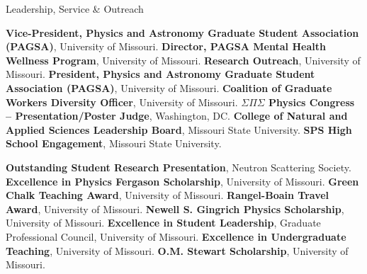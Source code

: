 \begin{rubric}{Leadership, Service \& Outreach}

\entry*[2023--2024] \textbf{Vice-President, Physics and Astronomy Graduate Student Association (PAGSA)}, University of Missouri.
\entry*[2022--2024] \textbf{Director, PAGSA Mental Health Wellness Program}, University of Missouri.
\entry*[2022--2024] \textbf{Research Outreach}, University of Missouri.
\entry*[2022--2023] \textbf{President, Physics and Astronomy Graduate Student Association (PAGSA)}, University of Missouri.
\entry*[2022--2023] \textbf{Coalition of Graduate Workers Diversity Officer}, University of Missouri.
\entry*[2022]       \textbf{$\Sigma \Pi \Sigma$ Physics Congress – Presentation/Poster Judge}, Washington, DC.
\entry*[2018--2019] \textbf{College of Natural and Applied Sciences Leadership Board}, Missouri State University.
\entry*[2017--2020] \textbf{SPS High School Engagement}, Missouri State University.

\entry*[2023] \textbf{Outstanding Student Research Presentation}, Neutron Scattering Society.
\entry*[2023] \textbf{Excellence in Physics Fergason Scholarship}, University of Missouri.
\entry*[2023] \textbf{Green Chalk Teaching Award}, University of Missouri.
\entry*[2023] \textbf{Rangel-Boain Travel Award}, University of Missouri.
\entry*[2022] \textbf{Newell S. Gingrich Physics Scholarship}, University of Missouri.
\entry*[2022] \textbf{Excellence in Student Leadership}, Graduate Professional Council, University of Missouri.
\entry*[2022] \textbf{Excellence in Undergraduate Teaching}, University of Missouri.
\entry*[2021] \textbf{O.M. Stewart Scholarship}, University of Missouri.

\end{rubric}


